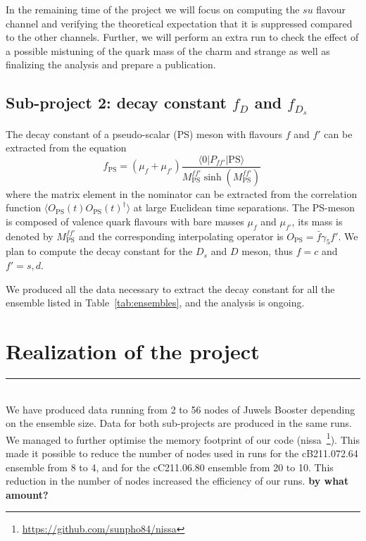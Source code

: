 \documentclass [a4paper, 11pt]{article}
\begin{document}
In the remaining time of the project we will focus on computing the
$su$ flavour channel and verifying the
theoretical expectation that it is suppressed compared to the other
channels. Further, we will perform an extra run to check the effect of a 
possible mistuning of the quark mass of the charm and strange as well
as finalizing the analysis and prepare a publication. 


\subsection{Sub-project 2: decay constant $f_D$ and $f_{D_s}$}

The decay constant of a pseudo-scalar (PS) meson with flavours $f$ and
$f'$ can be extracted from the equation
\begin{equation}
  f_\mathrm{PS}=(\mu_f+\mu_{f'})\frac{\langle 0| P_{ff'}|
    \mathrm{PS}\rangle}{M_\mathrm{PS}^{ff'}\sinh(M_\mathrm{PS}^{ff'})}\,
\end{equation}
where the matrix element in the nominator can be extracted from the
correlation function $\langle O_\mathrm{PS}(t)O_\mathrm{PS}(t)^\dagger
\rangle$ at large Euclidean time separations. The PS-meson is composed of
valence quark flavours with bare masses $\mu_f$ and $\mu_{f'}$,
its mass is denoted by $M_\mathrm{PS}^{ff'}$ and the corresponding interpolating
operator is $O_\mathrm{PS}=\bar f \gamma_5 f' $. We plan to compute the
decay constant for the $D_s$ and $D$ meson, thus $f=c$ and $f'=s,d$.

We produced all the data necessary to extract the decay constant for
all the ensemble listed in Table~\ref{tab:ensembles}, and the analysis
is ongoing.



\section{Realization of the project}
\rule{\textwidth}{0.4pt}\\


We have produced data running from 2 to 56 nodes of Juwels Booster
depending on the ensemble size. Data for both sub-projects are
produced in the same runs.
We managed to further optimise the memory footprint of our code
(nissa~\footnote{\url{https://github.com/sunpho84/nissa}}). This made
it possible to reduce the number of nodes used in runs for the
cB211.072.64 ensemble from 8 to 4, and for the cC211.06.80 ensemble
from 20 to 10. This reduction in the number of nodes increased the
efficiency of our runs. \textbf{by what amount?}
\end{document}

